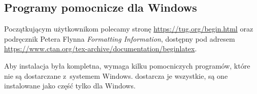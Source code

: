 \documentclass{article}
\let\textsl\textit
\begin{document}
\subsection{Programy pomocnicze dla Windows}

Początkującym użytkownikom polecamy stronę
\url{https://tug.org/begin.html} oraz podręcznik
Petera Flynna \textsl{Formatting Information}, dostępny pod adresem
\url{https://www.ctan.org/tex-archive/documentation/beginlatex}.

Aby instalacja była kompletna, \TL{} wymaga kilku pomocniczych
programów, które nie są dostarczane z~systemem Windows.
\TL{} dostarcza je  wszystkie,  są one instalowane jako część \TL{} tylko dla Windows.


\end{document}
